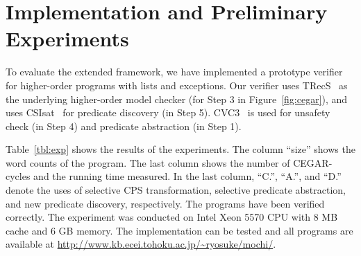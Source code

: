 
\section{Implementation and Preliminary Experiments}
\label{sec:experiments}

To evaluate the extended framework, we have implemented a prototype
verifier for higher-order programs with lists and exceptions.
Our verifier uses TRecS~\cite{KobayashiPOPL2009,KobayashiPPDP2009} as
the underlying higher-order model checker (for Step 3 in
Figure~\ref{fig:cegar}), and uses CSIsat~\cite{Beyer2008} for predicate
discovery (in Step 5).  CVC3~\cite{Barrett2007} is used for unsafety
check (in Step 4) and predicate abstraction (in Step 1).

Table~\ref{tbl:exp} shows the results of the experiments.  The column
``size'' shows the word counts of the program.  The last column shows
the number of CEGAR-cycles and the running time measured.  In the last
column, ``C.'', ``A.'', and ``D.''  denote the uses of selective CPS
transformation, selective predicate abstraction, and new predicate
discovery, respectively.  The programs have been verified correctly.
The experiment was conducted on Intel Xeon 5570 CPU with 8 MB cache and
6 GB memory.  The implementation can be tested and all programs are
available at \url{http://www.kb.ecei.tohoku.ac.jp/~ryosuke/mochi/}.

